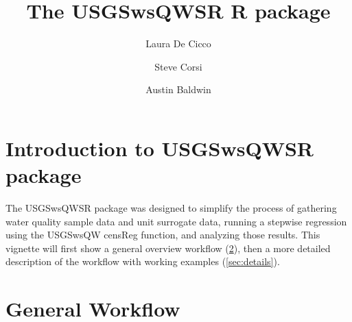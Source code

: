 \documentclass[a4paper,11pt]{article}\usepackage[]{graphicx}\usepackage[]{color}
\begin{document}
\title{The USGSwsQWSR R package}
\author[1]{Laura De Cicco}
\author[1]{Steve Corsi}
\author[1]{Austin Baldwin}






\maketitle
\tableofcontents

\section{Introduction to USGSwsQWSR package}
The USGSwsQWSR package was designed to simplify the process of gathering water quality sample data and unit surrogate data, running a stepwise regression using the USGSwsQW censReg function, and analyzing those results. This vignette will first show a general overview workflow  (\ref{sec:workflow}), then a more detailed description of the workflow with working examples (\ref{sec:details}).

\section{General Workflow}
\label{sec:workflow}
\end{document}
